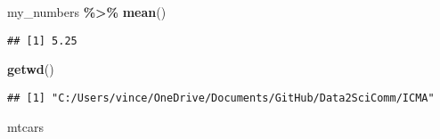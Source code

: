 \documentclass[
]{article}
\newenvironment{Shaded}{\begin{snugshade}}{\end{snugshade}}
\newcommand{\FunctionTok}[1]{\textcolor[rgb]{0.13,0.29,0.53}{\textbf{#1}}}
\newcommand{\NormalTok}[1]{#1}
\newcommand{\SpecialCharTok}[1]{\textcolor[rgb]{0.81,0.36,0.00}{\textbf{#1}}}
\begin{document}
\begin{Shaded}
\begin{Highlighting}[]
\NormalTok{my\_numbers }\SpecialCharTok{\%\textgreater{}\%}
  \FunctionTok{mean}\NormalTok{()}
\end{Highlighting}
\end{Shaded}

\begin{verbatim}
## [1] 5.25
\end{verbatim}

\begin{Shaded}
\begin{Highlighting}[]
\FunctionTok{getwd}\NormalTok{()}
\end{Highlighting}
\end{Shaded}

\begin{verbatim}
## [1] "C:/Users/vince/OneDrive/Documents/GitHub/Data2SciComm/ICMA"
\end{verbatim}

\begin{Shaded}
\begin{Highlighting}[]
\NormalTok{mtcars}
\end{Highlighting}
\end{Shaded}
\end{document}
